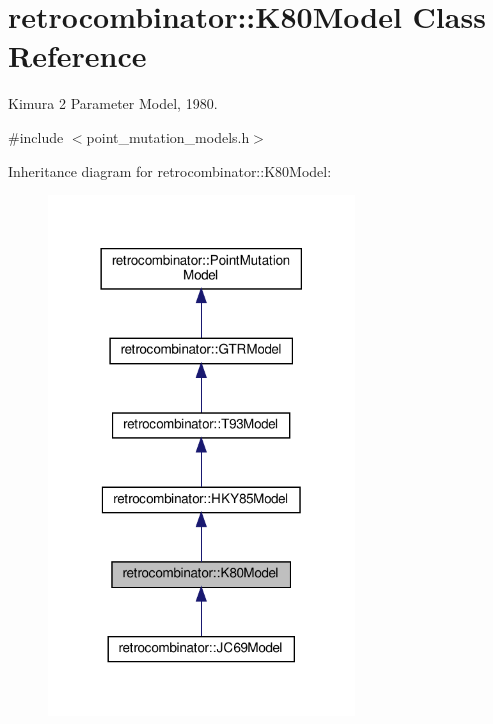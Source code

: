 \hypertarget{classretrocombinator_1_1K80Model}{}\section{retrocombinator\+:\+:K80\+Model Class Reference}
\label{classretrocombinator_1_1K80Model}


Kimura 2 Parameter Model, 1980.  




{\ttfamily \#include $<$point\+\_\+mutation\+\_\+models.\+h$>$}



Inheritance diagram for retrocombinator\+:\+:K80\+Model\+:\nopagebreak
\begin{figure}[H]
\begin{center}
\leavevmode
\includegraphics[width=230pt]{classretrocombinator_1_1K80Model__inherit__graph}
\end{center}
\end{figure}


